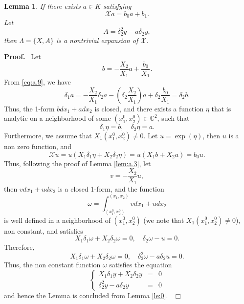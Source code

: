 \documentclass[preprint,12pt]{elsarticle}
\newtheorem{lem}[thm]{Lemma}
\newenvironment{proof}[1][Proof]{\textbf{#1.}\ }{\ $\Box$}
\begin{document}
\begin{lem}
\label{lem:a.4}If there exists $a\in K$ satisfying
\begin{equation}
\label{eq:a.9} \mathscr{X} a = b_0 a  + b_1.
\end{equation}
Let
\begin{equation}
A = \delta_2^2y - a \delta_2y,
\end{equation}
then $\Lambda = \{X,A\}$ is a nontrivial expansion of $\mathscr{X}$.
\end{lem}
\begin{proof}  Let 
$$b  = -\dfrac{X_2}{X_1} a + \dfrac{b_0}{X_1}.$$
From \eqref{eq:a.9}, we have
$$\delta_1 a = -\dfrac{X_2}{X_1} \delta_2 a - (\delta_2\dfrac{X_2}{X_1}) a + \delta_2 \dfrac{b_0}{X_1} = \delta_2 b.$$
Thus, the 1-form $bdx_1 + a dx_2$ is closed, and there exists a function $\eta$ that is  analytic on a neighborhood of some $(x_1^0,x_2^0)\in \mathbb{C}^2$, such that
$$\delta_1 \eta = b, \quad \delta_2 \eta = a.$$
Furthermore, we assume that $X_1(x_1^0,x_2^0)\not=0$. Let 
$u =  \exp(\eta)$, then $u$ is a non zero function, and 
$$
\mathscr{X}u = u (X_1 \delta_1 \eta + X_2 \delta_2 \eta)=u (X_1 b + X_2 a)  = b_0 u.
$$
Thus, following the proof of Lemma \ref{lem:a.3}, let
$$v = -\dfrac{X_2}{X_1}u,$$
then $v d x_1 + u d x_2$ is a closed 1-form, and the function 
$$\omega = \int_{(x_1^0,x_2^0)}^{(x_1,x_2)} vd x_1 + u dx_2$$
is well defined in a neighborhood of $(x_1^0,x_2^0)$ (we note that $X_1(x_1^0,x_2^0) \not=0$), non constant, and satisfies
$$X_1\delta_1\omega +X_2 \delta_2 \omega = 0,\quad \delta_2 \omega - u  = 0.$$
Therefore, 
$$X_1\delta_1\omega +X_2 \delta_2 \omega = 0, \quad \delta_2^2\omega - a \delta_2 u = 0.$$
Thus, the non constant function $\omega$ satisfies the equation
\begin{equation}
\left\{
\begin{array}{rcl}
X_1 \delta_1 y + X_2 \delta_2 y &=& 0 \\
\delta_2^2 y - a \delta_2 y &=& 0
\end{array}
\right.
\end{equation}
and hence the Lemma is concluded from Lemma \ref{le:0}.
\end{proof}
\end{document}
